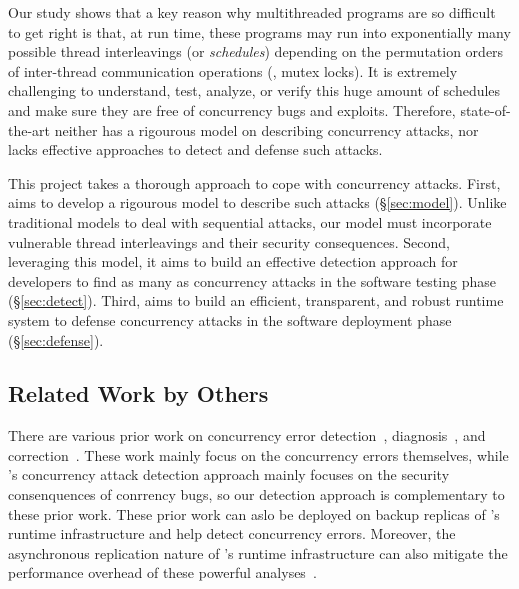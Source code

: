 Our study shows that a key reason why multithreaded programs are so difficult 
to get right is that, at run time, these programs may run into 
exponentially many possible thread interleavings (or \emph{schedules}) 
depending on the permutation orders of inter-thread communication operations 
(\eg, mutex locks). It is extremely challenging to understand, test, analyze, 
or verify this huge amount of schedules and make sure they are free of 
concurrency bugs and exploits. Therefore, state-of-the-art neither has a 
rigourous model on describing concurrency attacks, nor lacks effective 
approaches to detect and defense such attacks.

This \xxx project takes a thorough approach to cope with concurrency attacks.
First, \xxx aims to develop a rigourous model to describe such attacks 
(\S\ref{sec:model}). Unlike traditional models to deal with sequential attacks, 
our model must incorporate vulnerable thread interleavings and their security 
consequences. Second, leveraging this model, it aims to build an effective 
detection approach for developers to find as many as concurrency attacks in the 
software testing phase (\S\ref{sec:detect}). Third, \xxx aims to build an 
efficient, transparent, and robust runtime system to defense concurrency attacks 
in the software deployment phase (\S\ref{sec:defense}).



\subsection{Related Work by Others} \label{sec:others-work}

 There are various prior work on concurrency error 
detection~\cite{yu:racetrack:sosp,savage:eraser,racerx:sosp03,lu:muvi:sosp,
avio:asplos06,conmem:asplos10}, diagnosis~\cite{racefuzzer:pldi08,
ctrigger:asplos09,atomfuzzer:fse08}, 
and correction~\cite{dimmunix:osdi08,gadara:osdi08,wu:loom:osdi10,cfix:osdi12}. 
These work mainly focus on the concurrency errors themselves, while \xxx's 
concurrency attack detection approach mainly focuses on the security 
consenquences of conrrency bugs, so our detection approach is complementary to 
these prior work. These prior work can aslo be deployed on backup 
replicas of \xxx's runtime infrastructure and help \xxx detect concurrency 
errors. Moreover, the asynchronous replication nature of \xxx's runtime 
infrastructure can also mitigate the performance overhead of these powerful 
analyses~\cite{repframe:apsys15}.


